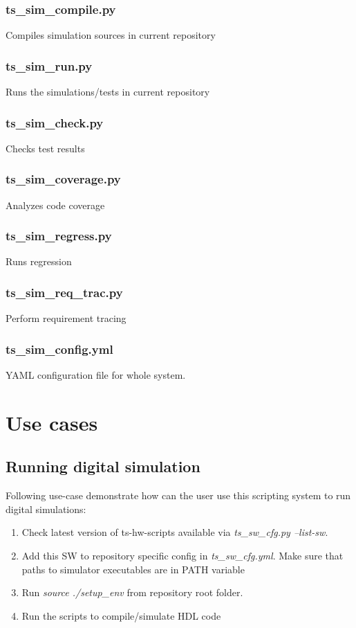 \documentclass{tropic_design_spec}
\begin{document}
\subsubsection*{ts_sim_compile.py}
Compiles simulation sources in current repository

\subsubsection*{ts_sim_run.py}
Runs the simulations/tests in current repository

\subsubsection*{ts_sim_check.py}
Checks test results

\subsubsection*{ts_sim_coverage.py}
Analyzes code coverage

\subsubsection*{ts_sim_regress.py}
Runs regression

\subsubsection*{ts_sim_req_trac.py}
Perform requirement tracing

\subsubsection*{ts_sim_config.yml}
YAML configuration file for whole system.


\pagebreak
\section{Use cases}

\subsection{Running digital simulation}
Following use-case demonstrate how can the user use this scripting system to
run digital simulations:
\begin{enumerate}
	\item{Check latest version of ts-hw-scripts available via \textit{ts_sw_cfg.py --list-sw}.}
	\item{Add this SW to repository specific config in \textit{ts_sw_cfg.yml}.
          Make sure that paths to simulator executables are in PATH variable}
    \item{Run \textit{source ./setup_env} from repository root folder.}
    \item{Run the scripts to compile/simulate HDL code}
\end{enumerate}
\end{document}
